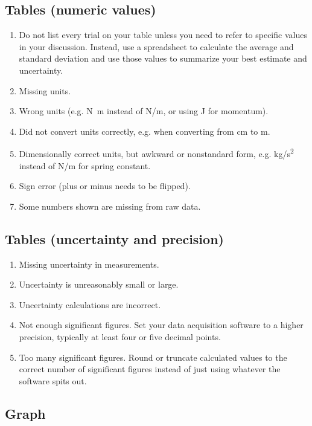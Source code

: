 \documentclass[10pt,letterpaper]{article}
\begin{document}
\begin{multicols}{2}
\subsection*{Tables (numeric values)}

\begin{enumerate}[start=60]
  \item Do not list every trial on your table
    unless you need to refer to specific values in your discussion.
    Instead, use a spreadsheet to calculate the average and standard deviation
    and use those values to summarize your best estimate and uncertainty.
  \item Missing units.
  \item Wrong units (e.g. \si{N.m} instead of \si{N/m},
    or using \si{J} for momentum).
  \item Did not convert units correctly,
    e.g. when converting from \si{cm} to \si{m}.
  \item Dimensionally correct units, but awkward or nonstandard form,
    e.g. \si{kg/s^2} instead of \si{N/m} for spring constant.
  \item Sign error (plus or minus needs to be flipped).
  \item Some numbers shown are missing from raw data.
\end{enumerate}

\subsection*{Tables (uncertainty and precision)}

\begin{enumerate}[start=70]
  \item Missing uncertainty in measurements.
  \item Uncertainty is unreasonably small or large.
  \item Uncertainty calculations are incorrect.
  \item Not enough significant figures.
    Set your data acquisition software to a higher precision,
    typically at least four or five decimal points.
  \item Too many significant figures.  Round or truncate calculated values
    to the correct number of significant figures
    instead of just using whatever the software spits out.
\end{enumerate}

\subsection*{Graph}


\end{multicols}
\end{document}
